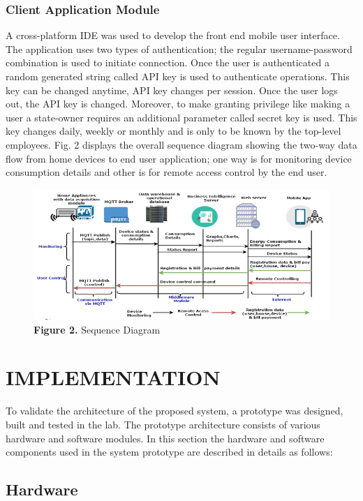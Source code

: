 \documentclass[a4paper,12pt,oneside]{article}
\let\counterwithin\relax
\begin{document}
\subsubsection{Client Application Module}
A cross-platform IDE was used to develop the front end
mobile user interface. The application uses two types of
authentication; the regular username-password combination is
used to initiate connection. Once the user is authenticated a
random generated string called API key is used to authenticate
operations. This key can be changed anytime, API key
changes per session. Once the user logs out, the API key is
changed. Moreover, to make granting privilege like making a
user a state-owner requires an additional parameter called
secret key is used. This key changes daily, weekly or monthly
and is only to be known by the top-level employees. Fig. 2
displays the overall sequence diagram showing the two-way
data flow from home devices to end user application; one way
is for monitoring device consumption details and other is for
remote access control by the end user.
\begin{figure}[H]
\includegraphics{figure2.png}
\centering
\caption{\textbf{Figure 2.} Sequence Diagram}
\end{figure}

\newpage
\section{IMPLEMENTATION}
To validate the architecture of the proposed system, a
prototype was designed, built and tested in the lab. The
prototype architecture consists of various hardware and
software modules. In this section the hardware and software
components used in the system prototype are described in
details as follows:
\subsection{Hardware}
\end{document}
